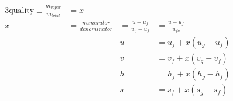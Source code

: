 \documentclass[10pt]{article}
\begin{document}
\begin{alignat*}{3}
\text{quality} \equiv \frac{m_{vapor}}{m_{total}}
&=  x  && \\
 x &= \frac{numerator}{denominator} &= \frac{u - u_f}{u_g - u_f}
&= \frac{u - u_f}{u_{fg}} \\
  && u &= u_f + x \left(u_g - u_f \right) \\
  && v &= v_f + x \left(v_g - v_f \right) \\
  && h &= h_f + x \left(h_g - h_f \right) \\
  && s &= s_f + x \left(s_g - s_f \right) 
\end{alignat*}
\end{document}
